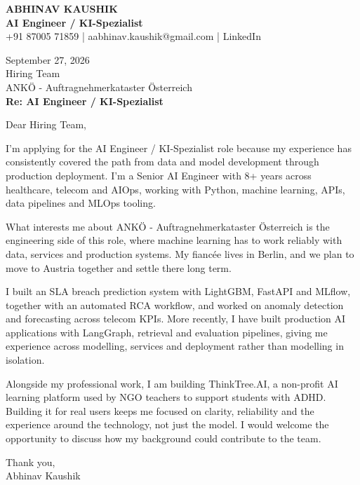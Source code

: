 \documentclass[10pt,a4paper]{article}
\begin{document}
\begin{center}
{\Large\bfseries ABHINAV KAUSHIK}\\[2pt]
{\bfseries AI Engineer / KI-Spezialist}\\[2pt]
+91 87005 71859 \quad | \quad aabhinav.kaushik@gmail.com \quad | \quad LinkedIn
\end{center}
\vspace{8pt}
September 27, 2026\\[6pt]
Hiring Team\\
ANKÖ - Auftragnehmerkataster Österreich\\[4pt]
\textbf{Re: AI Engineer / KI-Spezialist}

Dear Hiring Team,

I’m applying for the AI Engineer / KI-Spezialist role because my experience has consistently covered the path from data and model development through production deployment. I’m a Senior AI Engineer with 8+ years across healthcare, telecom and AIOps, working with Python, machine learning, APIs, data pipelines and MLOps tooling.

What interests me about ANKÖ - Auftragnehmerkataster Österreich is the engineering side of this role, where machine learning has to work reliably with data, services and production systems. My fiancée lives in Berlin, and we plan to move to Austria together and settle there long term.

I built an SLA breach prediction system with LightGBM, FastAPI and MLflow, together with an automated RCA workflow, and worked on anomaly detection and forecasting across telecom KPIs. More recently, I have built production AI applications with LangGraph, retrieval and evaluation pipelines, giving me experience across modelling, services and deployment rather than modelling in isolation.

Alongside my professional work, I am building ThinkTree.AI, a non-profit AI learning platform used by NGO teachers to support students with ADHD. Building it for real users keeps me focused on clarity, reliability and the experience around the technology, not just the model. I would welcome the opportunity to discuss how my background could contribute to the team.

Thank you,\\
Abhinav Kaushik
\end{document}
